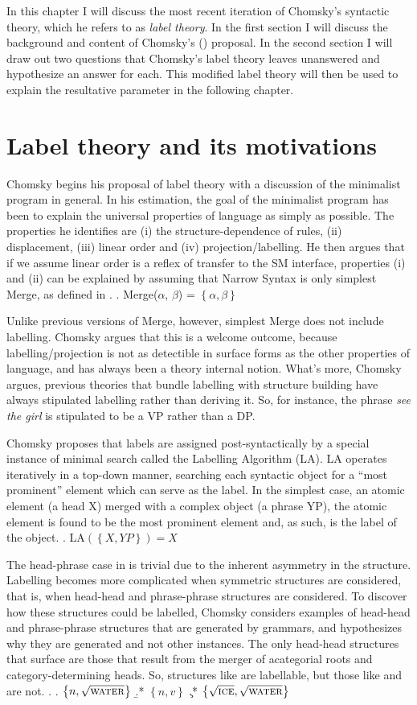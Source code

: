 \documentclass[MilwayThesis]{subfiles}
\begin{document}
In this chapter I will discuss the most recent iteration of Chomsky's syntactic theory, which he refers to as \textit{label theory}.
In the first section I will discuss the background and content of Chomsky's (\citeyear{chomsky2013problems,chomsky2015problems}) proposal.
In the second section I will draw out two questions that Chomsky's label theory leaves unanswered and hypothesize an answer for each.
This modified label theory will then be used to explain the resultative parameter in the following chapter.
\section{Label theory and its motivations}
Chomsky begins his proposal of label theory with a discussion of the minimalist program in general.
In his estimation, the goal of the minimalist program has been to explain the universal properties of language as simply as possible.
The properties he identifies are (i) the structure-dependence of rules, (ii) displacement, (iii) linear order and (iv) projection/labelling.
He then argues that if we assume linear order is a reflex of transfer to the SM interface, properties (i) and (ii) can be explained by assuming that Narrow Syntax is only simplest Merge, as defined in \Next.
\ex. Merge($\alpha$, $\beta$) = $\left\{ \alpha, \beta \right\}$

Unlike previous versions of Merge, however, simplest Merge does not include labelling.
Chomsky argues that this is a welcome outcome, because labelling/projection is not as detectible in surface forms as the other properties of language, and has always been a theory internal notion.
What's more, Chomsky argues, previous theories that bundle labelling with structure building have always stipulated labelling rather than deriving it.
So, for instance, the phrase \textit{see the girl} is stipulated to be a VP rather than a DP.

Chomsky proposes that labels are assigned post-syntactically by a special instance of minimal search called the Labelling Algorithm (LA).
LA operates iteratively in a top-down manner, searching each syntactic object for a ``most prominent'' element which can serve as the label.
In the simplest case, an atomic element (a head X) merged with a complex object (a phrase YP), the atomic element is found to be the most prominent element and, as such, is the label of the object.
\ex. LA$(\left\{ X, YP \right\}) = X$


The head-phrase case in \Last is trivial due to the inherent asymmetry in the structure.
Labelling becomes more complicated when symmetric structures are considered, that is, when head-head and phrase-phrase structures are considered.
To discover how these structures could be labelled, Chomsky considers examples of head-head and phrase-phrase structures that are generated by grammars, and hypothesizes why they are generated and not other instances.
The only head-head structures that surface are those that result from the merger of acategorial roots and category-determining heads.
So, structures like \Next[a] are labellable, but those like \Next[b] and \Next[c] are not.
\ex.
\a. $\left\{ n, \sqrt{\textsc{water}}\right\}$
\b.* $\left\{ n, v\right\}$
\c.* $\left\{ \sqrt{\textsc{ice}}, \sqrt{\textsc{water}} \right\}$
\end{document}
